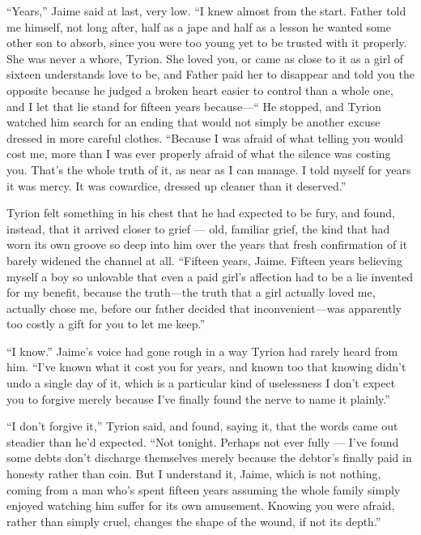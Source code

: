 “Years,” Jaime said at last, very low. “I knew almost from the start. Father told me himself, not long after, half as a jape and half as a lesson he wanted some other son to absorb, since you were too young yet to be trusted with it properly. She was never a whore, Tyrion. She loved you, or came as close to it as a girl of sixteen understands love to be, and Father paid her to disappear and told you the opposite because he judged a broken heart easier to control than a whole one, and I let that lie stand for fifteen years because—“ He stopped, and Tyrion watched him search for an ending that would not simply be another excuse dressed in more careful clothes. “Because I was afraid of what telling you would cost me, more than I was ever properly afraid of what the silence was costing you. That’s the whole truth of it, as near as I can manage. I told myself for years it was mercy. It was cowardice, dressed up cleaner than it deserved.”

Tyrion felt something in his chest that he had expected to be fury, and found, instead, that it arrived closer to grief — old, familiar grief, the kind that had worn its own groove so deep into him over the years that fresh confirmation of it barely widened the channel at all. “Fifteen years, Jaime. Fifteen years believing myself a boy so unlovable that even a paid girl’s affection had to be a lie invented for my benefit, because the truth—the truth that a girl actually loved me, actually chose me, before our father decided that inconvenient—was apparently too costly a gift for you to let me keep.”

“I know.” Jaime’s voice had gone rough in a way Tyrion had rarely heard from him. “I’ve known what it cost you for years, and known too that knowing didn’t undo a single day of it, which is a particular kind of uselessness I don’t expect you to forgive merely because I’ve finally found the nerve to name it plainly.”

“I don’t forgive it,” Tyrion said, and found, saying it, that the words came out steadier than he’d expected. “Not tonight. Perhaps not ever fully — I’ve found some debts don’t discharge themselves merely because the debtor’s finally paid in honesty rather than coin. But I understand it, Jaime, which is not nothing, coming from a man who’s spent fifteen years assuming the whole family simply enjoyed watching him suffer for its own amusement. Knowing you were afraid, rather than simply cruel, changes the shape of the wound, if not its depth.”

\sceneBreak

